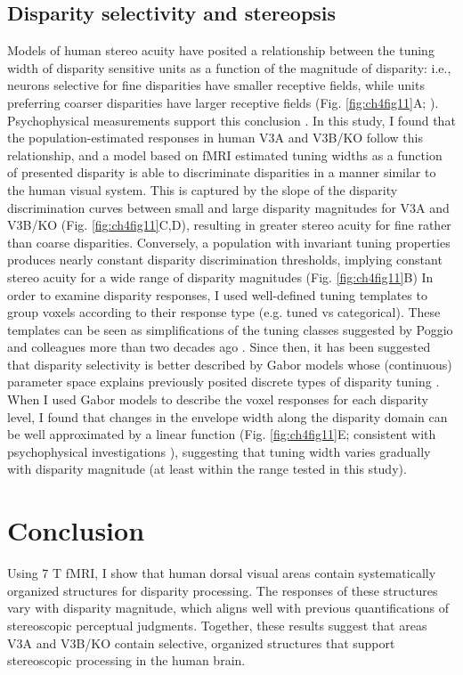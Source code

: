 \subsection{Disparity selectivity and stereopsis}
Models of human stereo acuity have posited a relationship between the tuning width of disparity sensitive units as a function of the magnitude of disparity: i.e., neurons selective for fine disparities have smaller receptive fields, while units preferring coarser disparities have larger receptive fields (Fig. \ref{fig:ch4fig11}A; \cite{Lehky:1990fk}). Psychophysical measurements support this conclusion \cite{Stevenson:1992kx}. In this study, I found that the population-estimated responses in human V3A and V3B/KO follow this relationship, and a model based on fMRI estimated tuning widths as a function of presented disparity is able to discriminate disparities in a manner similar to the human visual system. This is captured by the slope of the disparity discrimination curves between small and large disparity magnitudes for V3A and V3B/KO (Fig. \ref{fig:ch4fig11}C,D), resulting in greater stereo acuity for fine rather than coarse disparities. Conversely, a population with invariant tuning properties produces nearly constant disparity discrimination thresholds, implying constant stereo acuity for a wide range of disparity magnitudes (Fig. \ref{fig:ch4fig11}B)
In order to examine disparity responses, I used well-defined tuning templates to group voxels according to their response type (e.g. tuned vs categorical). These templates can be seen as simplifications of the tuning classes suggested by Poggio and colleagues more than two decades ago \cite{Poggio:1988ij}. Since then, it has been suggested that disparity selectivity is better described by Gabor models whose (continuous) parameter space explains previously posited discrete types of disparity tuning \cite{Prince:2002uq}. When I used Gabor models to describe the voxel responses for each disparity level, I found that changes in the envelope width along the disparity domain can be well approximated by a linear function (Fig. \ref{fig:ch4fig11}E; consistent with psychophysical investigations \cite{Stevenson:1992kx}), suggesting that tuning width varies gradually with disparity magnitude (at least within the range tested in this study). 

\section{Conclusion}
Using 7 T fMRI, I show that human dorsal visual areas contain systematically organized structures for disparity processing. The responses of these structures vary with disparity magnitude, which aligns well with previous quantifications of stereoscopic perceptual judgments. Together, these results suggest that areas V3A and V3B/KO contain selective, organized structures that support stereoscopic processing in the human brain.

